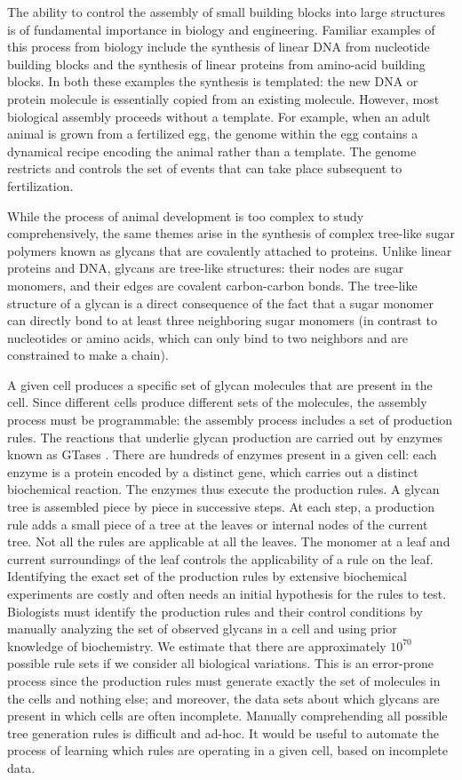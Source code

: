 The ability to control the assembly of small building blocks into large structures is of fundamental importance in biology and engineering. Familiar examples of this process from biology include the synthesis of linear DNA from nucleotide building blocks and the synthesis of linear proteins from amino-acid building blocks. In both these examples the synthesis is templated: the new DNA or protein molecule is essentially copied from an existing molecule. However, most biological assembly proceeds without a template. For example, when an adult animal is grown from a fertilized egg, the genome within the egg contains a dynamical recipe encoding the animal rather than a template. The genome restricts and controls the set of events that can take place subsequent to fertilization.

While the process of animal development is too complex to study comprehensively, the same themes arise in the synthesis of complex tree-like sugar polymers known as glycans \cite{Varki2017} that are covalently attached to proteins. Unlike linear proteins and DNA, glycans are tree-like structures: their nodes are sugar monomers, and their edges are covalent carbon-carbon bonds. The tree-like structure of a glycan is a direct consequence of the fact that a sugar monomer can directly bond to at least three neighboring sugar monomers (in contrast to nucleotides or amino acids, which can only bind to two neighbors and are constrained to make a chain).

A given cell produces a specific set of glycan molecules that are present in the cell. Since different cells produce different sets of the molecules,
the assembly process must be programmable: the assembly process includes a set of production rules. The reactions that underlie glycan production are carried out by enzymes known as GTases \cite{Varki2017}. There are hundreds of enzymes present in a given cell: each enzyme is a protein encoded by a distinct gene, which carries out a distinct biochemical reaction. The enzymes thus execute the production rules. A glycan tree is assembled piece by piece in successive steps. At each step, a production rule adds a small piece of a tree %
at the leaves or internal nodes of the current tree.
Not all the rules are applicable at all the leaves. The monomer at a leaf and current surroundings of the leaf controls
the applicability of a rule on the leaf.
Identifying the exact set of the production rules by extensive
biochemical experiments are costly and often needs an initial
hypothesis for the rules to test. Biologists must identify the production rules and their control
conditions by manually analyzing the set of observed glycans in a cell
and using prior knowledge of biochemistry.
We estimate that there are approximately $10^{70}$
possible rule sets if we consider all biological variations.
This is an error-prone process since the production rules must generate
exactly the set of molecules in the cells and nothing else; and moreover, the data sets about which glycans are present in which cells are often incomplete. Manually comprehending all possible tree generation rules is difficult and ad-hoc. It would be useful to automate the process of learning which rules are operating in a given cell, based on incomplete data.

